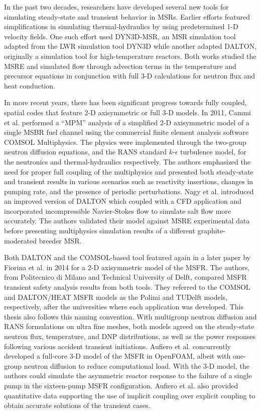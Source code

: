 In the past two decades, researchers have developed several
new tools for simulating steady-state and transient behavior in \glspl{MSR}.
Earlier efforts featured simplifications in simulating
thermal-hydraulics by using predetermined 1-D velocity fields. One such effort
\cite{krepel_dyn3d-msr_2007} used DYN3D-MSR, an \gls{MSR} simulation tool
adapted from the \gls{LWR} simulation tool DYN3D while another
\cite{kophazi_development_2009} adapted DALTON, originally a simulation
tool for high-temperature reactors. Both works studied the \gls{MSRE} and
simulated flow through advection terms in the temperature and precursor
equations in conjunction with full 3-D calculations for neutron flux and heat
conduction.

In more recent years, there has been
significant progress towards fully coupled, spatial codes that feature
2-D axisymmetric or full 3-D models. In 2011, Cammi et al.
\cite{cammi_multi-physics_2011} performed a ``\gls{MPM}'' analysis
of a simplified 2-D axisymmetric model of a single \gls{MSBR} fuel channel
using the commercial finite element analysis software COMSOL Multiphysics. The
physics were implemented through the two-group neutron diffusion equations,
and the \gls{RANS} standard $k$-$\epsilon$ turbulence model, for the
neutronics and thermal-hydraulics respectively. The
authors emphasized the need for proper full coupling of the multiphysics and
presented both steady-state and transient results in various
scenarios such as reactivity insertions, changes in pumping rate, and the
presence of periodic perturbations. Nagy et al. \cite{nagy_steady-state_2014}
introduced an improved version of DALTON which coupled with a \gls{CFD}
application and incorporated incompressible
Navier-Stokes flow to simulate salt flow more accurately. The authors
validated their model against \gls{MSRE} experimental data before presenting
multiphysics simulation results of a different graphite-moderated breeder
\gls{MSR}.

Both DALTON and the COMSOL-based tool featured again in a later paper by
Fiorina et al. \cite{fiorina_modelling_2014} in 2014 for a 2-D axisymmetric
model of the \gls{MSFR}. The authors, from Politecnico di Milano and
Technical University of Delft, compared \gls{MSFR} transient safety
analysis results from both tools. They referred to the COMSOL and DALTON/HEAT
\gls{MSFR} models as the Polimi and TUDelft models, respectively, after the
universities where each application was developed. This thesis also follows
this naming convention. With
multigroup neutron diffusion and \gls{RANS} formulations on ultra fine meshes,
both models agreed on the steady-state neutron flux, temperature,
and \gls{DNP} distributions, as well as the power responses following various
accident transient initiations.
Aufiero et al. \cite{aufiero_development_2014} concurrently developed
a full-core 3-D model of the \gls{MSFR} in OpenFOAM, albeit with one-group
neutron diffusion to reduce computational load. With the 3-D model, the
authors could simulate the asymmetric reactor response to the failure of a
single pump in the sixteen-pump \gls{MSFR} configuration. Aufiero et al. also
provided quantitative data supporting the use of implicit coupling over
explicit coupling to obtain accurate solutions of the transient cases.

